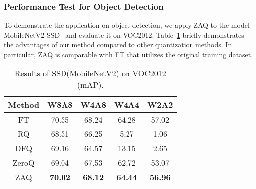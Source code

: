 \documentclass[final]{cvpr}
\begin{document}
\begin{table}[!t]
  \centering
  \caption{Results on Cityscapes and CamVid (mIoU).}
  \label{tab:seg}
\end{table}

\subsubsection{Performance Test for Object Detection}

To demonstrate the application on object detection, we apply ZAQ to the model MobileNetV2 SSD~\cite{liu2016ssd} and evaluate it on VOC2012. Table~\ref{tab:obj_det} briefly demonstrates the advantages of our method compared to other quantization methods. 
In particular, ZAQ is comparable with FT that utilizes the original training dataset.

\begin{table}[t]
  \centering
\begin{tabular}{c|cccc}
  \toprule
  Method & W8A8 & W4A8 & W4A4 & W2A2 \\
  \midrule
  FT    & 70.35 &	68.24 & 64.28 &	57.02 \\\hline
  RQ    & 68.31 & 66.25 & 5.27 & 1.06 \\
  DFQ   & 69.16 & 64.57 &	13.15 & 2.65 \\
  ZeroQ & 69.04 & 67.53 &	62.72 & 53.07 \\
  ZAQ   & \textbf{70.02}& \textbf{68.12}&	\textbf{64.44}& \textbf{56.96} \\
  \bottomrule
  \end{tabular}
\caption{Results of SSD(MobileNetV2) on VOC2012 (mAP).}
  \label{tab:obj_det}
  \vspace{-2mm}
\end{table}
\end{document}
